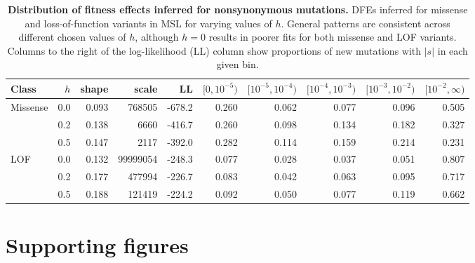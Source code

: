 \documentclass[]{article}
\begin{document}
\begin{table}
    \centering
    \small
    \begin{tabular}{lrrrrrrrrr}
        \toprule
        Class & $h$ & shape & scale & LL &
        $[0,10^{-5})$ & $[10^{-5},10^{-4})$ & $[10^{-4},10^{-3})$ &
        $[10^{-3},10^{-2})$ & $[10^{-2},\infty)$\\
        \midrule
        Missense & 0.0 & 0.093 & 768505 & -678.2 & 0.260 & 0.062 & 0.077 & 0.096 & 0.505\\
         & 0.2 & 0.138 & 6660 & -416.7 & 0.260 & 0.098 & 0.134 & 0.182 & 0.327\\
         & 0.5 & 0.147 & 2117 & -392.0 & 0.282 & 0.114 & 0.159 & 0.214 & 0.231\\
        \addlinespace
        LOF & 0.0 & 0.132 & 99999054 & -248.3 & 0.077 & 0.028 & 0.037 & 0.051 & 0.807\\
         & 0.2 & 0.177 & 477994 & -226.7 & 0.083 & 0.042 & 0.063 & 0.095 & 0.717\\
         & 0.5 & 0.188 & 121419 & -224.2 & 0.092 & 0.050 & 0.077 & 0.119 & 0.662\\
        \bottomrule
    \end{tabular}
    \caption{
        \textbf{Distribution of fitness effects inferred for nonsynonymous mutations.}
        DFEs inferred for missense and loss-of-function variants in MSL for varying
        values of $h$. General patterns are consistent across different chosen values
        of $h$, although $h=0$ results in poorer fits for both missense and LOF variants.
        Columns to the right of the log-likelihood (LL) column show proportions of
        new mutations with $|s|$ in each given bin.
    }
    \label{tab:msldfe}
\end{table}

\clearpage
\newpage

\section{Supporting figures}
\end{document}

